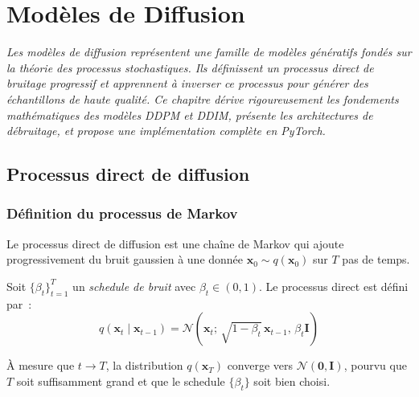 \chapter{Mod\`eles de Diffusion}
\label{ch:diffusion}

\noindent\textit{Les mod\`eles de diffusion repr\'esentent une famille de mod\`eles g\'en\'eratifs
fond\'es sur la th\'eorie des processus stochastiques. Ils d\'efinissent un
processus direct de bruitage progressif et apprennent \`a inverser ce processus
pour g\'en\'erer des \'echantillons de haute qualit\'e. Ce chapitre d\'erive
rigoureusement les fondements math\'ematiques des mod\`eles DDPM et DDIM,
pr\'esente les architectures de d\'ebruitage, et propose une impl\'ementation
compl\`ete en PyTorch.}\medskip

\section{Processus direct de diffusion}
\label{sec:diffusion-forward}

\subsection{D\'efinition du processus de Markov}

Le processus direct de diffusion est une cha\^ine de Markov qui ajoute
progressivement du bruit gaussien \`a une donn\'ee $\mathbf{x}_0 \sim q(\mathbf{x}_0)$
sur $T$ pas de temps.

\begin{definition}
\label{def:forward-diffusion}
Soit $\{\beta_t\}_{t=1}^{T}$ un \emph{schedule de bruit}
avec $\beta_t \in (0, 1)$. Le processus direct est d\'efini par~:
\begin{equation}
q(\mathbf{x}_t \mid \mathbf{x}_{t-1}) = \mathcal{N}\!\left(\mathbf{x}_t;\, \sqrt{1 - \beta_t}\,\mathbf{x}_{t-1},\, \beta_t \mathbf{I}\right)
\label{eq:forward-step}
\end{equation}
\end{definition}

\begin{remarque}
\`A mesure que $t \to T$, la distribution $q(\mathbf{x}_T)$ converge vers
$\mathcal{N}(\mathbf{0}, \mathbf{I})$, pourvu que $T$ soit suffisamment grand
et que le schedule $\{\beta_t\}$ soit bien choisi.
\end{remarque}

